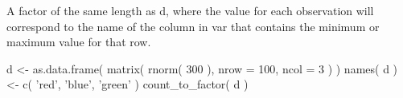 \documentclass[letterpaper]{book}
\begin{document}
%
\begin{Value}
A factor of the same length as d, where the value for each observation will correspond
to the name of the column in var that
contains the minimum or maximum value for that row.
\end{Value}
%
\begin{Examples}
\begin{ExampleCode}
d <- as.data.frame( matrix( rnorm( 300 ), nrow = 100, ncol = 3 ) )
names( d ) <- c( 'red', 'blue', 'green' )
count_to_factor( d )

\end{ExampleCode}
\end{Examples}
\printindex{}
\end{document}
